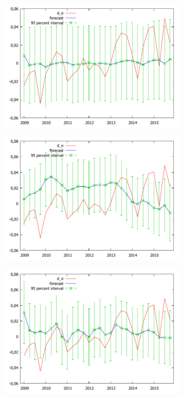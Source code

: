 \documentclass[10pt]{article}
\numberwithin{equation}{section}
\numberwithin{table}{section}
\numberwithin{figure}{section}
\begin{document}
\begin{spacing}{1.5}
\begin{figure}[h!]
\begin{subfigure}{.5\textwidth}
  \centering
  \includegraphics[width=\linewidth]{images/RWForecast.pdf}
  \label{fig:sfig1}
\end{subfigure}%
\begin{subfigure}{.5\textwidth}
  \centering
  \includegraphics[width=\linewidth]{images/ReitonForecast.pdf}
  \label{fig:sfig2}
\end{subfigure}
\begin{subfigure}{.5\textwidth}
  \centering
  \includegraphics[width=\linewidth]{images/BjornlandForecast.pdf}

\end{subfigure}
\end{figure}
\end{spacing}
\end{document}

